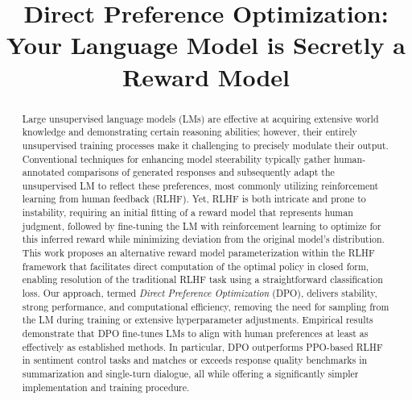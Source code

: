 \title{Direct Preference Optimization: Your Language Model is Secretly a Reward Model}

\begin{abstract}
Large unsupervised language models (LMs) are effective at acquiring extensive world knowledge and demonstrating certain reasoning abilities; however, their entirely unsupervised training processes make it challenging to precisely modulate their output. Conventional techniques for enhancing model steerability typically gather human-annotated comparisons of generated responses and subsequently adapt the unsupervised LM to reflect these preferences, most commonly utilizing reinforcement learning from human feedback (RLHF). Yet, RLHF is both intricate and prone to instability, requiring an initial fitting of a reward model that represents human judgment, followed by fine-tuning the LM with reinforcement learning to optimize for this inferred reward while minimizing deviation from the original model’s distribution. This work proposes an alternative reward model parameterization within the RLHF framework that facilitates direct computation of the optimal policy in closed form, enabling resolution of the traditional RLHF task using a straightforward classification loss. Our approach, termed \textit{Direct Preference Optimization} (DPO), delivers stability, strong performance, and computational efficiency, removing the need for sampling from the LM during training or extensive hyperparameter adjustments. Empirical results demonstrate that DPO fine-tunes LMs to align with human preferences at least as effectively as established methods. In particular, DPO outperforms PPO-based RLHF in sentiment control tasks and matches or exceeds response quality benchmarks in summarization and single-turn dialogue, all while offering a significantly simpler implementation and training procedure.
\end{abstract}

